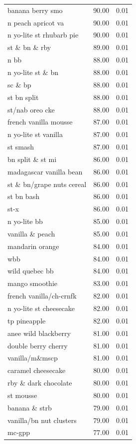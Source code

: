 \begin{table}
\begin{tabular}{lrr}
banana berry smo & 90.00 & 0.01 \\
n peach apricot va & 90.00 & 0.01 \\
n yo-lite st rhubarb pie & 90.00 & 0.01 \\
st \& bn \& rby & 89.00 & 0.01 \\
n bb & 88.00 & 0.01 \\
n yo-lite st \& bn & 88.00 & 0.01 \\
sc \& bp & 88.00 & 0.01 \\
st bn split & 88.00 & 0.01 \\
st/nab oreo cke & 88.00 & 0.01 \\
french vanilla mousse & 87.00 & 0.01 \\
n yo-lite st vanilla & 87.00 & 0.01 \\
st smash & 87.00 & 0.01 \\
bn split \& st mi & 86.00 & 0.01 \\
madagascar vanilla bean & 86.00 & 0.01 \\
st \& bn/grape nuts cereal & 86.00 & 0.01 \\
st bn bash & 86.00 & 0.01 \\
st-x & 86.00 & 0.01 \\
n yo-lite bb & 85.00 & 0.01 \\
vanilla \& peach & 85.00 & 0.01 \\
mandarin orange & 84.00 & 0.01 \\
wbb & 84.00 & 0.01 \\
wild quebec bb & 84.00 & 0.01 \\
mango smoothie & 83.00 & 0.01 \\
french vanilla/ch-crnfk & 82.00 & 0.01 \\
n yo-lite st cheesecake & 82.00 & 0.01 \\
tp pineapple & 82.00 & 0.01 \\
anee wild blackberry & 81.00 & 0.01 \\
double berry cherry & 81.00 & 0.01 \\
vanilla/m\&mscp & 81.00 & 0.01 \\
caramel cheesecake & 80.00 & 0.01 \\
rby \& dark chocolate & 80.00 & 0.01 \\
st mousse & 80.00 & 0.01 \\
banana \& strb & 79.00 & 0.01 \\
vanilla/bn nut clusters & 79.00 & 0.01 \\
mc-gpp & 77.00 & 0.01 \\

\end{tabular}
\end{table}
